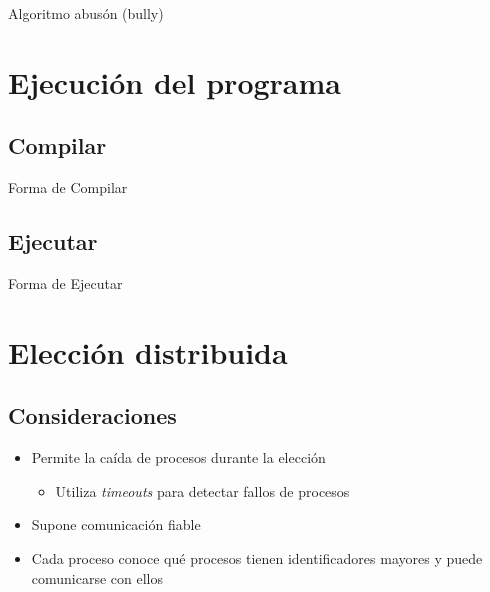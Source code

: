\documentclass[a4paper,12pt]{article}
\begin{document}


\newpage

\begin{center}
    {\huge Algoritmo abusón (bully)}
\end{center}

\section*{Ejecución del programa}

\subsection*{Compilar}
\begin{center}    
    Forma de Compilar 
\end{center}

\subsection*{Ejecutar}
\begin{center}
    Forma de Ejecutar
\end{center}


\section*{Elección distribuida}

\subsection*{Consideraciones}

\begin{itemize}
    \item Permite la caída de procesos durante la elección
     \begin{itemize}
        \item Utiliza \textit{timeouts} para detectar fallos de procesos
     \end{itemize}
    \item Supone comunicación fiable
    \item Cada proceso conoce qué procesos tienen identificadores mayores y puede comunicarse con ellos
\end{itemize}
\end{document}
